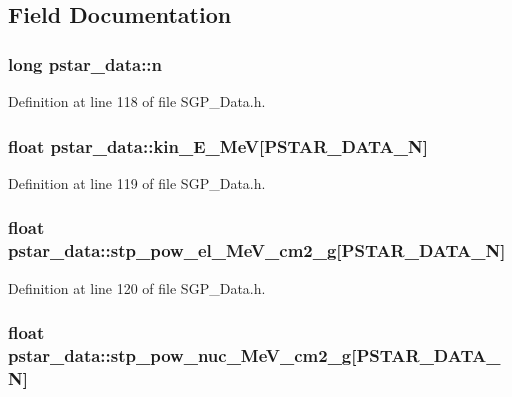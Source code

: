 \subsection{Field Documentation}
\hypertarget{structpstar__data_b673e7b9aced6ac41c2f526699051ba8}{
\subsubsection[n]{\setlength{\rightskip}{0pt plus 5cm}long {\bf pstar\_\-data::n}}}
\label{df/d58/structpstar__data_b673e7b9aced6ac41c2f526699051ba8}




Definition at line 118 of file SGP\_\-Data.h.\hypertarget{structpstar__data_ed3ea605781911d8bbcd22d3eab16e35}{
\subsubsection[kin\_\-E\_\-MeV]{\setlength{\rightskip}{0pt plus 5cm}float {\bf pstar\_\-data::kin\_\-E\_\-MeV}\mbox{[}PSTAR\_\-DATA\_\-N\mbox{]}}}
\label{df/d58/structpstar__data_ed3ea605781911d8bbcd22d3eab16e35}




Definition at line 119 of file SGP\_\-Data.h.\hypertarget{structpstar__data_ca618cfe3331d8496644230660585274}{
\subsubsection[stp\_\-pow\_\-el\_\-MeV\_\-cm2\_\-g]{\setlength{\rightskip}{0pt plus 5cm}float {\bf pstar\_\-data::stp\_\-pow\_\-el\_\-MeV\_\-cm2\_\-g}\mbox{[}PSTAR\_\-DATA\_\-N\mbox{]}}}
\label{df/d58/structpstar__data_ca618cfe3331d8496644230660585274}




Definition at line 120 of file SGP\_\-Data.h.\hypertarget{structpstar__data_30e9e431834a83e1a5c061f431cbf5ac}{
\subsubsection[stp\_\-pow\_\-nuc\_\-MeV\_\-cm2\_\-g]{\setlength{\rightskip}{0pt plus 5cm}float {\bf pstar\_\-data::stp\_\-pow\_\-nuc\_\-MeV\_\-cm2\_\-g}\mbox{[}PSTAR\_\-DATA\_\-N\mbox{]}}}
\label{df/d58/structpstar__data_30e9e431834a83e1a5c061f431cbf5ac}





